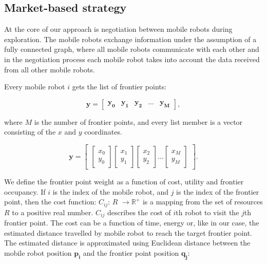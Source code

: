 \documentclass[letterpaper, 10 pt, conference]{ieeeconf}  %
\begin{document}
\subsection{Market-based strategy} 

At the core of our approach is negotiation between mobile robots during exploration. The mobile robots exchange information under the assumption of a fully connected graph, where all mobile robots communicate with each other and in the negotiation process each mobile robot takes into account the data received from all other mobile robots.

Every mobile robot $i$ gets the list of frontier points:

\begin{equation}
   \boldsymbol{y}=\begin{bmatrix}
    \boldsymbol{y_{0}} & \boldsymbol{y_{1}} & \boldsymbol{y_{2}} & \hdots & \boldsymbol{y_{M}}
\end{bmatrix},
\end{equation}

where $M$ is  the number of frontier points, and every list member is a vector consisting of the $x$ and $y$ coordinates. 

\begin{equation}
   \boldsymbol{y}=\begin{bmatrix}
   \begin{bmatrix}
           x_{0} \\
           y_{0} 
   \end{bmatrix}
    \begin{bmatrix}
         x_{1} \\
         y_{1} 
    \end{bmatrix}
    \begin{bmatrix}
         x_{2} \\
         y_{2} 
    \end{bmatrix}
    \hdots
    \begin{bmatrix}
         x_{M} \\
         y_{M} 
    \end{bmatrix}
\end{bmatrix}.
\end{equation}


We define the frontier point weight as a function of cost, utility and frontier occupancy. If $i$ is the index of the mobile robot, and $j$ is the index of the frontier point, then the cost function: $C_{ij}$: $R$ \(\rightarrow \text{$\mathbb{R}^{+}$}\) is a mapping from the set of resources $R$ to a positive real number. $C_{ij}$ describes the cost of $i$th robot to visit the $j$th frontier point. The cost can be a function of time, energy or, like in our case, the estimated distance travelled by mobile robot to reach the target frontier point. The estimated distance is approximated using Euclidean distance between the mobile robot position $\boldsymbol{p_{i}}$ and the frontier point position $\boldsymbol{q_{j}}$:
\end{document}
